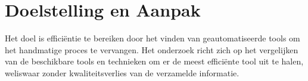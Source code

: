 
\section{Doelstelling en Aanpak}
Het doel is efficiëntie te bereiken door het vinden van geautomatiseerde tools om het handmatige proces te vervangen. 
Het onderzoek richt zich op het vergelijken van de beschikbare tools en technieken om er de meest efficiënte tool uit te halen, weliswaar zonder kwaliteitsverlies van de verzamelde informatie.






